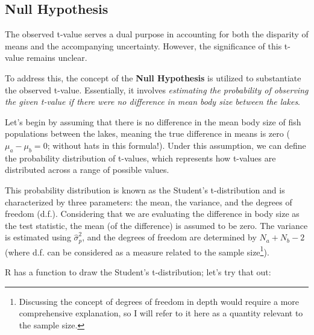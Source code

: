 \documentclass[
]{book}
\begin{document}
\hypertarget{null-hypothesis}{%
\subsection{Null Hypothesis}\label{null-hypothesis}}

The observed t-value serves a dual purpose in accounting for both the disparity of means and the accompanying uncertainty. However, the significance of this t-value remains unclear.

To address this, the concept of the \textbf{Null Hypothesis} is utilized to substantiate the observed t-value. Essentially, it involves \emph{estimating the probability of observing the given t-value if there were no difference in mean body size between the lakes}.

Let's begin by assuming that there is no difference in the mean body size of fish populations between the lakes, meaning the true difference in means is zero (\(\mu_a - \mu_b = 0\); without hats in this formula!). Under this assumption, we can define the probability distribution of t-values, which represents how t-values are distributed across a range of possible values.

This probability distribution is known as the Student's t-distribution and is characterized by three parameters: the mean, the variance, and the degrees of freedom (d.f.). Considering that we are evaluating the difference in body size as the test statistic, the mean (of the difference) is assumed to be zero. The variance is estimated using \(\hat{\sigma}^2_p\), and the degrees of freedom are determined by \(N_a + N_b - 2\) (where d.f. can be considered as a measure related to the sample size\footnote{Discussing the concept of degrees of freedom in depth would require a more comprehensive explanation, so I will refer to it here as a quantity relevant to the sample size.}).

R has a function to draw the Student's t-distribution; let's try that out:
\end{document}
